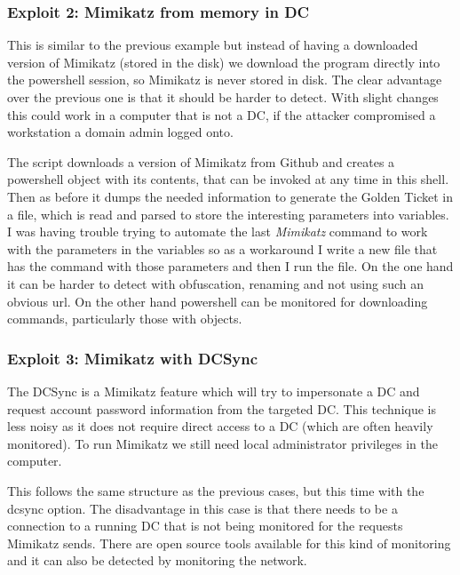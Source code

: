 \subsubsection{Exploit 2: Mimikatz from memory in DC}
This is similar to the previous example but instead of having a downloaded version of Mimikatz (stored in the disk) we download the program directly into the powershell session, so Mimikatz is never stored in disk.
The clear advantage over the previous one is that it should be harder to detect.
\linej
With slight changes this could work in a computer that is not a DC, if the attacker compromised a workstation a domain admin logged onto\cite{dump_ways}.
\linej

\linej
The script downloads a version of Mimikatz from Github and creates a powershell object with its contents, that can be invoked at any time in this shell\cite{powersploit}\cite{mimikatz_details}. Then as before it dumps the needed information to generate the Golden Ticket in a file, which is read and parsed to store the interesting parameters into variables.
\linej
I was having trouble trying to automate the last \textit{Mimikatz} command to work with the parameters in the variables so as a workaround I write a new file that has the command with those parameters and then I run the file.
\linej
\linej
On the one hand it can be harder to detect with obfuscation, renaming and not using such an obvious url.
On the other hand powershell can be monitored for downloading commands, particularly those with objects.

\subsubsection{Exploit 3: Mimikatz with DCSync}
The DCSync is a Mimikatz feature which will try to impersonate a DC and request account password information from the targeted DC. This technique is less noisy as it does not require direct access to a DC (which are often heavily monitored)\cite{dump_ways}\cite{pentestlab}. To run Mimikatz we still need local administrator privileges in the computer.
\linej

\linej
This follows the same structure as the previous cases, but this time with the dcsync option.
The disadvantage in this case is that there needs to be a connection to a running DC that is not being monitored for the requests Mimikatz sends. There are open source tools available for this kind of monitoring\cite{dcsync_monitor} and it can also be detected by monitoring the network\cite{dcsync_monitor_network}.

